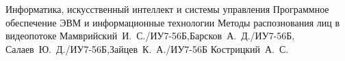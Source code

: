 \documentclass{bmstu}
\begin{document}
	
	\makeresearchtitle
    {Информатика, искусственный интеллект и системы управления} %
    {Программное обеспечение ЭВМ и информационные технологии} %
    {Методы распознования лиц в видеопотоке} %
    {Мамврийский~И.~С./ИУ7-56Б,Барсков~А.~Д./ИУ7-56Б, Салаев~Ю.~Д./ИУ7-56Б,Зайцев~К.~А./ИУ7-56Б} %
    {Кострицкий~А.~С.} %
    {} %
	
	\setcounter{page}{3}
    \maketableofcontents
	
	
	
	
	
	
	

    \makebibliography
\end{document}
